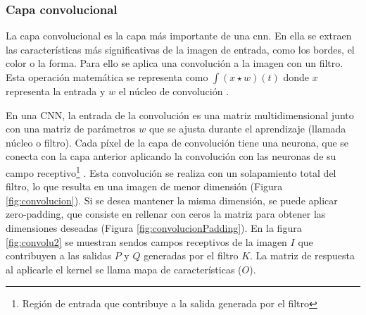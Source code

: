 \subsubsection*{Capa convolucional}

La capa convolucional es la capa más importante de una \acrshort{cnn}. En ella se extraen las características más significativas de la imagen de entrada, como los bordes, el color o la forma. Para ello se aplica una convolución a la imagen con un filtro. Esta operación matemática se representa como \( \int (x \star w)(t) \) donde $x$ representa la entrada y $w$ el núcleo de convolución \citep{pajares2021aprendizaje}.


En una CNN, la entrada de la convolución es una matriz multidimensional junto con una matriz de parámetros $w$ que se ajusta durante el aprendizaje (llamada núcleo o filtro). Cada píxel de la capa de convolución tiene una neurona, que se conecta con la capa anterior aplicando la convolución con las neuronas de su campo receptivo\footnote{Región de entrada que contribuye a la salida generada por el filtro} \cite{geron2022hands}. Esta convolución se realiza con un solapamiento total del filtro, lo que resulta en una imagen de menor dimensión (Figura \ref{fig:convolucion}). Si se desea mantener la misma dimensión, se puede aplicar zero-padding, que consiste en rellenar con ceros la matriz para obtener las dimensiones deseadas (Figura \ref{fig:convolucionPadding}). En la figura \ref{fig:convolu2} se muestran sendos campos receptivos de la imagen \( I \) que contribuyen a las salidas \( P \) y \( Q \) generadas por el filtro \( K \). La matriz de respuesta al aplicarle el kernel se llama mapa de características ($O$).


